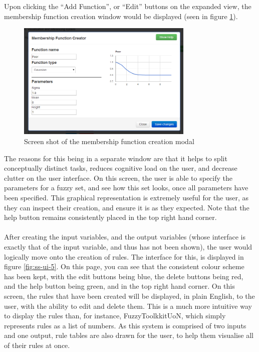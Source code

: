 \noindent 
Upon clicking the ``Add Function'', or ``Edit'' buttons on the expanded view, the membership function creation window would be displayed (seen in figure \ref{fig:ss-ui-4}).


\begin{figure}[ht!]
	\begin{center}
		\includegraphics[width=0.75\textwidth]{images/ui-4}
	\end{center}
	\vspace{-6mm}	
	\caption{Screen shot of the membership function creation modal}
	\label{fig:ss-ui-4}
	\vspace{-6mm}	
\end{figure}

\noindent
The reasons for this being in a separate window are that it helps to split conceptually distinct tasks, reduces cognitive load on the user, and decrease clutter on the user interface. On this screen, the user is able to specify the parameters for a fuzzy set, and see how this set looks, once all parameters have been specified. This graphical representation is extremely useful for the user, as they can inspect their creation, and ensure it is as they expected. Note that the help button remains consistently placed in the top right hand corner.\ \\
\ \\
After creating the input variables, and the output variables (whose interface is exactly that of the input variable, and thus has not been shown), the user would logically move onto the creation of rules. The interface for this, is displayed in figure \ref{fig:ss-ui-5}. On this page, you can see that the consistent colour scheme has been kept, with the edit buttons being blue, the delete buttons being red, and the help button being green, and in the top right hand corner. On this screen, the rules that have been created will be displayed, in plain English, to the user, with the ability to edit and delete them. This is a much more intuitive way to display the rules than, for instance, FuzzyToolkkitUoN, which simply represents rules as a list of numbers. As this system is comprised of two inputs and one output, rule tables are also drawn for the user, to help them visualise all of their rules at once.

